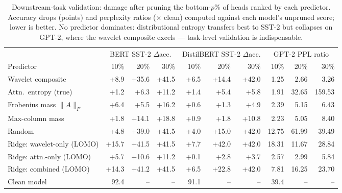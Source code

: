 \begin{table}[t]
\centering
\caption{Downstream-task validation: damage after pruning the
bottom-$p$\% of heads ranked by each predictor. Accuracy drops
(points) and perplexity ratios ($\times$ clean) computed against
each model's unpruned score; lower is better. No predictor
dominates: distributional entropy transfers best to SST-2 but
collapses on GPT-2, where the wavelet composite excels ---
task-level validation is indispensable.}
\label{tab:downstream}
\begin{tabular}{lrrrrrrrrr}
\toprule
 & \multicolumn{3}{c}{BERT SST-2 $\Delta$acc.} & \multicolumn{3}{c}{DistilBERT SST-2 $\Delta$acc.} & \multicolumn{3}{c}{GPT-2 PPL ratio} \\
Predictor & 10\% & 20\% & 30\% & 10\% & 20\% & 30\% & 10\% & 20\% & 30\% \\
\midrule
Wavelet composite & +8.9 & +35.6 & +41.5 & +6.5 & +14.4 & +42.0 & 1.25 & 2.66 & 3.26 \\
Attn.\ entropy (true) & +1.2 & +6.3 & +11.2 & +1.4 & +5.4 & +5.8 & 1.91 & 32.65 & 159.53 \\
Frobenius mass $\|A\|_F$ & +6.4 & +5.5 & +16.2 & +0.6 & +1.3 & +4.9 & 2.39 & 5.15 & 6.43 \\
Max-column mass & +1.8 & +14.1 & +18.8 & +0.9 & +1.8 & +10.8 & 2.23 & 5.05 & 8.40 \\
Random & +4.8 & +39.0 & +41.5 & +4.0 & +15.0 & +42.0 & 12.75 & 61.99 & 39.49 \\
Ridge: wavelet-only (LOMO) & +15.7 & +41.5 & +41.5 & +7.7 & +42.0 & +42.0 & 18.31 & 11.67 & 28.84 \\
Ridge: attn.-only (LOMO) & +5.7 & +10.6 & +11.2 & +0.1 & +2.8 & +3.7 & 2.57 & 2.99 & 5.84 \\
Ridge: combined (LOMO) & +14.3 & +41.2 & +41.5 & +6.5 & +22.8 & +42.0 & 7.81 & 16.25 & 23.70 \\
\midrule
Clean model & 92.4 & -- & -- & 91.1 & -- & -- & 39.4 & -- & -- \\
\bottomrule
\end{tabular}
\end{table}
